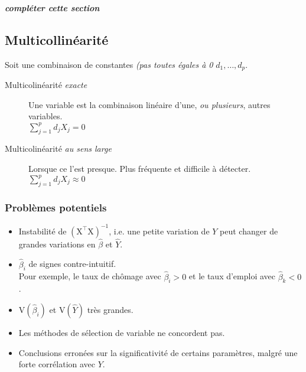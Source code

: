 \documentclass[10pt, french]{article}
\begin{document}
\begin{multicols*}{3}
\textit{\textbf{compléter cette section}}

\subsection*{Multicollinéarité}
Soit une combinaison de constantes \textit{(pas toutes égales à 0} $d_{1}, \dots, d_{p}$.
\begin{description}
	\item[Multicolinéarité \textit{exacte}] Une variable est la combinaison linéaire d'une, \textit{ou plusieurs}, autres variables.\\
	$\sum_{j = 1}^{p}d_{j}X_{j} = 0$
	\item[Multicolinéarité \textit{au sens large}] Lorsque ce l'est presque. Plus fréquente et difficile à détecter. \\
	$\sum_{j = 1}^{p}d_{j}X_{j} \approx 0$
\end{description}

\subsubsection*{Problèmes potentiels}
\begin{itemize}
\item Instabilité de $\mathrm{(X^\top X)^{-1}}$, i.e. une petite variation de $Y$ peut changer de grandes variations en $\hat{\beta}$ et $\hat{Y}$.
\item $\hat{\beta}_i$ de signes contre-intuitif.\\
 Pour exemple, le taux de chômage avec $\hat{\beta}_i > 0$ et le taux d'emploi avec $\hat{\beta}_k < 0$.
\item $\text{V}(\hat{\beta}_i)$ et $\text{V}(\hat{Y})$ très grandes.
\item Les méthodes de sélection de variable ne concordent pas.
\item Conclusions erronées sur la significativité de certains paramètres, malgré une forte corrélation avec $Y$.
\end{itemize}


\end{multicols*}
\end{document}
